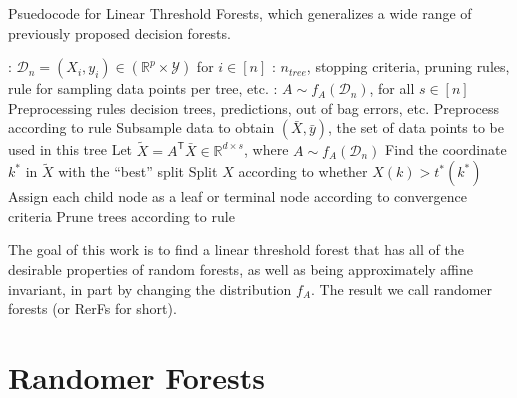 \documentclass{article} %
\newcommand{\Real}{\mathbb{R}}
\providecommand{\mc}[1]{\mathcal{#1}}
\providecommand{\mt}[1]{\widetilde{#1}}
\newcommand{\T}{^{\ensuremath{\mathsf{T}}}}           %
\begin{document}
\begin{algorithm}
\caption{Psuedocode for Linear Threshold Forests, which generalizes a wide range of previously proposed decision forests.} \label{pseudo}
\begin{algorithmic}[1]
\Require 
: $\mc{D}_n = (X_i,y_i) \in (\Real^p \times \mc{Y})$ for $i \in [n]$
:  $n_{tree}$, stopping criteria, pruning rules, rule for sampling data points per tree, etc.
: $A \sim f_A(\mc{D}_n)$, for all $s \in [n]$
\State Preprocessing rules
\Ensure decision trees, predictions, out of bag errors, etc. 
\State Preprocess according to rule
\State Subsample data to obtain $(\bar{X},\bar{y})$, the set of data points to be used in this tree
\State Let $\mt{X} =  A\T \bar{X} \in \Real^{d \times s}$, where $A \sim f_A(\mc{D}_n)$
\State Find the coordinate $k^*$ in $\mt{X}$ with the ``best'' split
\State Split $X$ according to whether $X(k) > t^*(k^*)$
\State Assign each child node as a leaf or terminal  node according to convergence criteria
\EndFor
\EndFor
\State Prune trees according to rule
\end{algorithmic}
\end{algorithm}

The goal of this work is to find a linear threshold forest that has all of the desirable properties of random forests, as well as being approximately affine invariant, in part by changing the distribution $f_A$. The result we call randomer forests (or RerFs for short).


\section{Randomer Forests}
\end{document}
